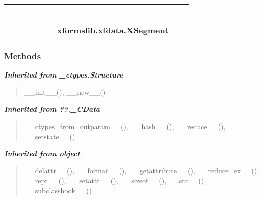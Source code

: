     \label{xformslib:xfdata:XSegment}
\begin{tabular}{cccccccccc}
\multicolumn{2}{r}{\settowidth{\BCL}{object}\multirow{2}{\BCL}{object}}
&&
&&
&&
  \\\cline{3-3}
  &&\multicolumn{1}{c|}{}
&&
&&
&&
  \\
\multicolumn{4}{r}{\settowidth{\BCL}{??.\_CData}\multirow{2}{\BCL}{??.\_CData}}
&&
&&
  \\\cline{5-5}
  &&&&\multicolumn{1}{c|}{}
&&
&&
  \\
\multicolumn{6}{r}{\settowidth{\BCL}{\_ctypes.Structure}\multirow{2}{\BCL}{\_ctypes.Structure}}
&&
  \\\cline{7-7}
  &&&&&&\multicolumn{1}{c|}{}
&&
  \\
&&&&&&\multicolumn{2}{l}{\textbf{xformslib.xfdata.XSegment}}
\end{tabular}



  \subsubsection{Methods}


\large{\textbf{\textit{Inherited from \_ctypes.Structure}}}

\begin{quote}
\_\_init\_\_(), \_\_new\_\_()
\end{quote}

\large{\textbf{\textit{Inherited from ??.\_CData}}}

\begin{quote}
\_\_ctypes\_from\_outparam\_\_(), \_\_hash\_\_(), \_\_reduce\_\_(), \_\_setstate\_\_()
\end{quote}

\large{\textbf{\textit{Inherited from object}}}

\begin{quote}
\_\_delattr\_\_(), \_\_format\_\_(), \_\_getattribute\_\_(), \_\_reduce\_ex\_\_(), \_\_repr\_\_(), \_\_setattr\_\_(), \_\_sizeof\_\_(), \_\_str\_\_(), \_\_subclasshook\_\_()
\end{quote}


